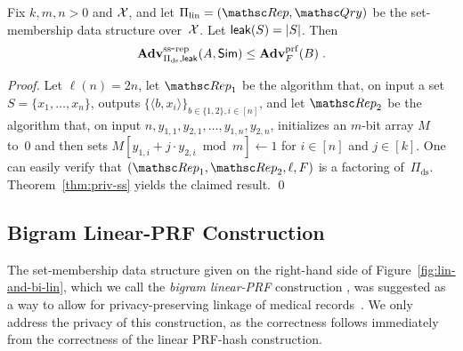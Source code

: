 \begin{theorem}%
\label{thm:lin-privacy} Fix $k,m,n>0$ and ${\cal X}$, and let
$\setprim_{\mathrm{lin}}= (\Rep, \Qry)$ be the set-membership data
structure over~${\cal X}$. Let ${\sf leak}(S)=|S|$.  Then 
\[
\mathrm{\mathbf{Adv}}^{\mathrm{ss\mbox{-}rep}}_{\Pi_{\mathrm{ds}},{\sf leak}}(A,{\sf Sim}) \leq  \mathbf{Adv}^{\mathrm{prf}}_{F}(B)\;.
\]
\end{theorem}
\begin{proof}
Let $\ell(n) = 2n$, let $\Rep_1$ be the algorithm that, on input a
set $S=\{x_1,\ldots,x_n\}$, outputs $\{\langle b,x_i \rangle\}_{b\in
\{1,2\}, i \in [n]}$, and let $\Rep_2$ be the algorithm that, on
input $n,y_{1,1}, y_{2,1}, \ldots, y_{1,n}, y_{2,n}$,  initializes
an $m$-bit array $M$ to~0 and then sets $M[y_{1,i}+j \cdot y_{2,i}
\bmod m] \gets 1$ for $i \in [n]$ and $j \in [k]$. One can easily
verify that $(\Rep_1, \Rep_2, \ell, F)$ is a factoring
of~$\Pi_{\mathrm{ds}}$. Theorem~\ref{thm:priv-ss} yields the claimed
result. \hfill\qed
\end{proof}

\subsection{Bigram Linear-PRF Construction}

The set-membership data structure given on the right-hand side of
Figure~\ref{fig:lin-and-bi-lin}, which we call the \emph{bigram
linear-PRF} construction , was
suggested as a way to allow for privacy-preserving
linkage of medical records~\cite{niedermeyer2014cryptanalysis}. %
 We only address the privacy of this
construction, as the correctness follows immediately from the
correctness of the linear PRF-hash construction. 

